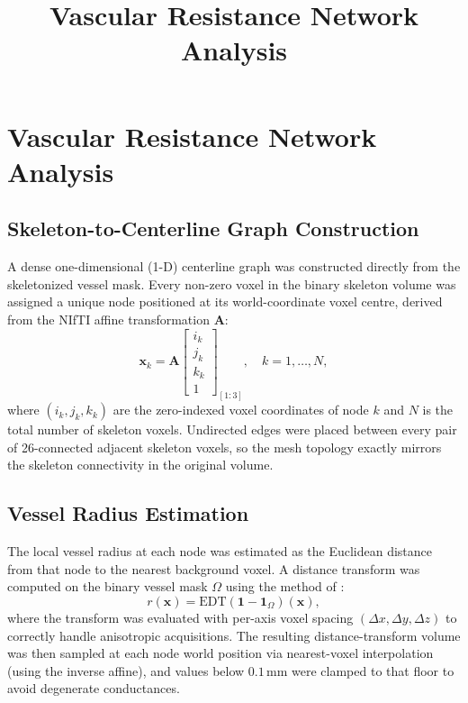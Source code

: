 \documentclass[11pt]{article}
\title{Vascular Resistance Network Analysis}
\author{}
\date{}
\begin{document}
\maketitle

\section{Vascular Resistance Network Analysis}
\label{sec:resistance_lumping}

\subsection{Skeleton-to-Centerline Graph Construction}

A dense one-dimensional (1-D) centerline graph was constructed directly from the
skeletonized vessel mask.  Every non-zero voxel in the binary skeleton volume was
assigned a unique node positioned at its world-coordinate voxel centre, derived
from the NIfTI affine transformation $\mathbf{A}$:
%
\begin{equation}
  \mathbf{x}_k = \mathbf{A}
  \begin{bmatrix} i_k \\ j_k \\ k_k \\ 1 \end{bmatrix}_{[1:3]},
  \quad k = 1, \ldots, N,
\end{equation}
%
where $(i_k, j_k, k_k)$ are the zero-indexed voxel coordinates of node $k$ and
$N$ is the total number of skeleton voxels.  Undirected edges were placed between
every pair of 26-connected adjacent skeleton voxels, so the mesh topology exactly
mirrors the skeleton connectivity in the original volume.

\subsection{Vessel Radius Estimation}

The local vessel radius at each node was estimated as the Euclidean distance from
that node to the nearest background voxel.  A distance transform was computed on
the binary vessel mask $\Omega$ using the method of
\citet{meijster2000general}:
%
\begin{equation}
  r(\mathbf{x}) = \mathrm{EDT}\!\left(\mathbf{1} - \mathbf{1}_\Omega\right)\!(\mathbf{x}),
\end{equation}
%
where the transform was evaluated with per-axis voxel spacing
$(\Delta x, \Delta y, \Delta z)$ to correctly handle anisotropic acquisitions.
The resulting distance-transform volume was then sampled at each node world
position via nearest-voxel interpolation (using the inverse affine), and values
below $0.1\,\mathrm{mm}$ were clamped to that floor to avoid degenerate
conductances.
\end{document}
